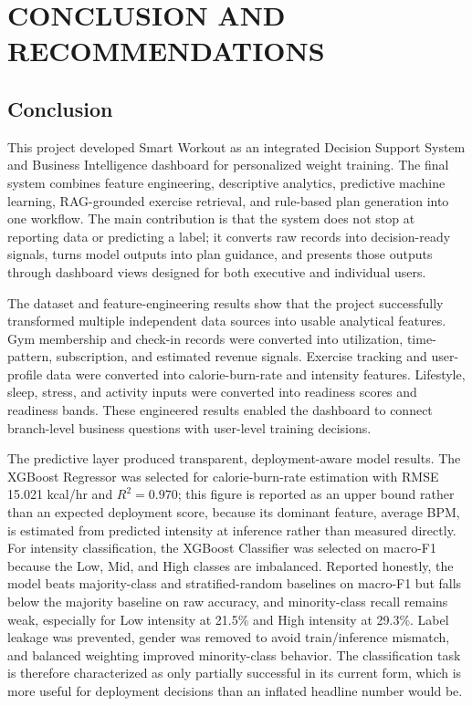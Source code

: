 \documentclass{aitthesis}
\begin{document}
\chapter{CONCLUSION AND RECOMMENDATIONS}
\section{Conclusion}

This project developed Smart Workout as an integrated Decision Support System and Business Intelligence dashboard for personalized weight training. The final system combines feature engineering, descriptive analytics, predictive machine learning, RAG-grounded exercise retrieval, and rule-based plan generation into one workflow. The main contribution is that the system does not stop at reporting data or predicting a label; it converts raw records into decision-ready signals, turns model outputs into plan guidance, and presents those outputs through dashboard views designed for both executive and individual users.

The dataset and feature-engineering results show that the project successfully transformed multiple independent data sources into usable analytical features. Gym membership and check-in records were converted into utilization, time-pattern, subscription, and estimated revenue signals. Exercise tracking and user-profile data were converted into calorie-burn-rate and intensity features. Lifestyle, sleep, stress, and activity inputs were converted into readiness scores and readiness bands. These engineered results enabled the dashboard to connect branch-level business questions with user-level training decisions.

The predictive layer produced transparent, deployment-aware model results. The XGBoost Regressor was selected for calorie-burn-rate estimation with RMSE 15.021 kcal/hr and $R^2=0.970$; this figure is reported as an upper bound rather than an expected deployment score, because its dominant feature, average BPM, is estimated from predicted intensity at inference rather than measured directly. For intensity classification, the XGBoost Classifier was selected on macro-F1 because the Low, Mid, and High classes are imbalanced. Reported honestly, the model beats majority-class and stratified-random baselines on macro-F1 but falls below the majority baseline on raw accuracy, and minority-class recall remains weak, especially for Low intensity at 21.5\% and High intensity at 29.3\%. Label leakage was prevented, gender was removed to avoid train/inference mismatch, and balanced weighting improved minority-class behavior. The classification task is therefore characterized as only partially successful in its current form, which is more useful for deployment decisions than an inflated headline number would be.
\end{document}
